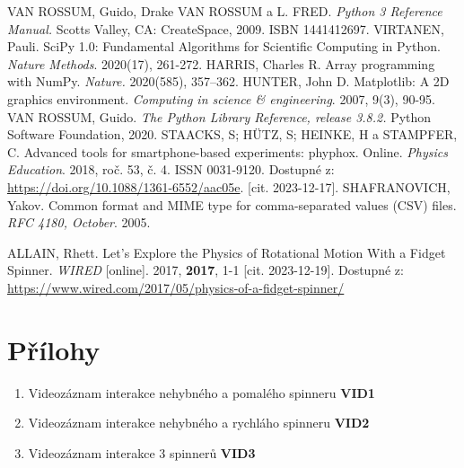 \documentclass[12pt, a4paper,
 twoside,        %
 openright
]{report}
\begin{document}
\begin{thebibliography}{99}
     VAN ROSSUM, Guido, Drake VAN ROSSUM a L. FRED. \textit{Python 3 Reference Manual.} Scotts Valley, CA: CreateSpace, 2009. ISBN 1441412697.
     VIRTANEN, Pauli. SciPy 1.0: Fundamental Algorithms for Scientific Computing in Python. \textit{Nature Methods}. 2020(17), 261-272.
     HARRIS, Charles R. Array programming with NumPy. \textit{Nature.} 2020(585), 357–362.
     HUNTER, John D. Matplotlib: A 2D graphics environment. \textit{Computing in science \& engineering}. 2007, 9(3), 90-95.
     VAN ROSSUM, Guido. \textit{The Python Library Reference, release 3.8.2.} Python Software Foundation, 2020.
     STAACKS, S; HÜTZ, S; HEINKE, H a STAMPFER, C. Advanced tools for smartphone-based experiments: phyphox. Online. \textit{Physics Education}. 2018, roč. 53, č. 4. ISSN 0031-9120. Dostupné z: \url{https://doi.org/10.1088/1361-6552/aac05e}. [cit. 2023-12-17].
     SHAFRANOVICH, Yakov. Common format and MIME type for comma-separated values (CSV) files. \textit{RFC 4180, October}. 2005.
    
     ALLAIN, Rhett. Let’s Explore the Physics of Rotational Motion With a Fidget Spinner. \textit{WIRED} [online]. 2017, \textbf{2017}, 1-1 [cit. 2023-12-19]. Dostupné z: \url{https://www.wired.com/2017/05/physics-of-a-fidget-spinner/}
\end{thebibliography}

\listoffigures

\listoftables

\lstlistoflistings

\chapter*{Přílohy}
\begin{enumerate}[topsep=0pt, partopsep=0pt]
    \setlength{\itemsep}{0pt}%
    \setlength{\parskip}{0pt}%
    \item \label{attachment_1} Videozáznam interakce nehybného a pomalého spinneru \dotfill \textbf{VID1}
    \item \label{attachment_2} Videozáznam interakce nehybného a rychláho spinneru \dotfill \textbf{VID2}
    \item \label{attachment_3} Videozáznam interakce 3 spinnerů \dotfill \textbf{VID3}
\end{enumerate}
\end{document}
